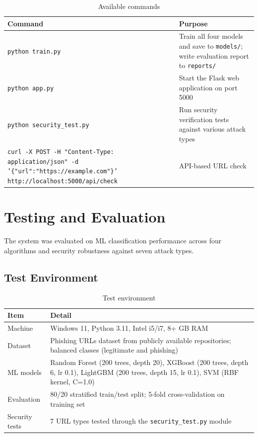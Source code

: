 \documentclass[11pt,a4paper]{article}
\begin{document}
\begin{table}[H]
\centering
\begin{tabularx}{\textwidth}{@{}p{5.6cm}L@{}}
\toprule
\textbf{Command} & \textbf{Purpose} \\ \midrule
\texttt{python train.py} & Train all four models and save to \texttt{models/}; write evaluation report to \texttt{reports/} \\
\texttt{python app.py} & Start the Flask web application on port 5000 \\
\texttt{python security\_test.py} & Run security verification tests against various attack types \\
\texttt{curl -X POST -H "Content-Type: application/json" -d '\{"url":"https://example.com"\}' http://localhost:5000/api/check} & API-based URL check \\ \bottomrule
\end{tabularx}
\caption{Available commands}
\end{table}

\clearpage
\section{Testing and Evaluation}

The system was evaluated on ML classification performance across four algorithms and security robustness against seven attack types.

\subsection{Test Environment}

\begin{table}[H]
\centering
\small
\begin{tabularx}{\textwidth}{@{}p{3.6cm}L@{}}
\toprule
\textbf{Item} & \textbf{Detail} \\ \midrule
Machine & Windows 11, Python 3.11, Intel i5/i7, 8+ GB RAM \\
Dataset & Phishing URLs dataset from publicly available repositories; balanced classes (legitimate and phishing) \\
ML models & Random Forest (200 trees, depth 20), XGBoost (200 trees, depth 6, lr 0.1), LightGBM (200 trees, depth 15, lr 0.1), SVM (RBF kernel, C=1.0) \\
Evaluation & 80/20 stratified train/test split; 5-fold cross-validation on training set \\
Security tests & 7 URL types tested through the \texttt{security\_test.py} module \\ \bottomrule
\end{tabularx}
\caption{Test environment}
\end{table}
\end{document}
